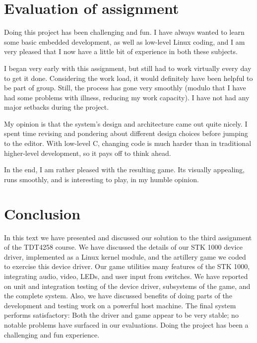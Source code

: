 \documentclass[a4paper,10pt]{article}
\begin{document}
\section{Evaluation of assignment}
\label{sec:eval}
Doing this project has been challenging and fun. I have always wanted to learn
some basic embedded development, as well as  low-level Linux coding, and I am
very pleased that I now have a little bit of experience in both these
subjects. 

I began very early with this assignment, but still had to work virtually every
day to get it done. Considering the work load, it would definitely have been
helpful to be part of group.  Still, the process has gone very smoothly
(modulo that I have had some problems with illness, reducing my work
capacity). I have not had any major setbacks during the project.

My opinion is that the system's design and architecture came out quite nicely.
I spent time revising and pondering about different design choices before
jumping to the editor. With low-level C, changing code is much harder than in
traditional higher-level development, so it pays off to think ahead.

In the end, I am rather pleased with the resulting game. Its visually
appealing, runs smoothly, and is interesting to play, in my humble opinion.


\section{Conclusion}
\label{sec:conclusion}
In this text we have presented and discussed our solution to the third
assignment of the TDT4258 course.  We have discussed the details of our STK
1000 device driver, implemented as a Linux kernel module, and the artillery
game we coded to exercise this device driver. Our game utilities many features
of the STK 1000, integrating audio, video, LEDs, and user input from switches.
We have reported on unit and integration testing of the device driver,
subsystems of the game, and the complete system. Also, we have discussed
benefits of doing parts of the development and testing work on a powerful host
machine.  The final system performs satisfactory: Both the driver and game
appear to be very stable; no notable problems have surfaced in our
evaluations. Doing the project has been a challenging and fun experience.



\end{document}

